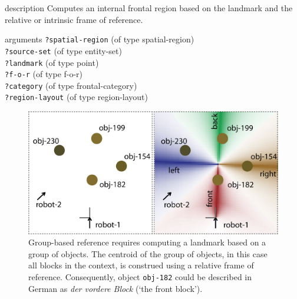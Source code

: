\begin{explanation}{description}
Computes an internal frontal region based on the landmark
and the relative or intrinsic frame of reference.
\end{explanation}
\begin{explanation}{arguments}
{\footnotesize\verb+?spatial-region+} (of type spatial-region) \\
{\footnotesize\verb+?source-set+} (of type entity-set) \\
{\footnotesize\verb+?landmark+} (of type point)\\
{\footnotesize\verb+?f-o-r+} (of type f-o-r)\\
{\footnotesize\verb+?category+} (of type frontal-category)\\
{\footnotesize\verb+?region-layout+} (of type region-layout)
\vspace{0.3cm}
\end{explanation}

\begin{figure}
\begin{centering}
\includegraphics[width=0.7\columnwidth]{figs/space-scene-3483324847-group-based-reference.png}
\caption[Group-based reference explanation.]
{Group-based reference requires computing a landmark based on 
a group of objects. The centroid of the group of objects, in this case 
all blocks in the context, is construed using a relative frame of reference.
Consequently, object {\footnotesize\tt obj-182} could be described in German as 
\textit{der vordere Block} (`the front block').}
\label{f:6:space-scene-2}
\end{centering}
\end{figure}

